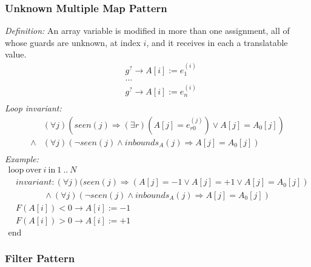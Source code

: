 \documentclass[a4paper,10pt]{article}
\newcommand{\idx}{\ensuremath{i}\xspace}
\newcommand{\at}[1]{{(#1)}}
\newcommand{\KWloop}{\ensuremath{\mathrm{loop}~}}
\newcommand{\KWend}{\ensuremath{\mathrm{end}~}}
\newcommand{\KWover}{\ensuremath{\mathrm{over}~}}
\newcommand{\KWin}{\ensuremath{~\mathrm{in}~}}
\newcommand{\impl}{\ensuremath{\Longrightarrow}}
\newcommand{\inbounds}[2]{\ensuremath{\mathit{inbounds}_{#1}(#2)}\xspace}
\newcommand{\seen}[1]{\ensuremath{\mathit{seen}(#1)}\xspace}
\newcommand{\loopinvariant}{\noindent\textit{Loop invariant:}\xspace}
\newcommand{\patterndef}{\noindent\textit{Definition:}\xspace}
\newcommand{\patternexample}{\noindent\textit{Example:}\xspace}
\begin{document}
\subsubsection*{Unknown Multiple Map Pattern}

\patterndef An array variable is modified in more than one assignment, all
of whose guards are unknown, at index \idx, and it receives in each a
translatable value.
%
\begin{eqnarray*}
&g^? \rightarrow A[\idx] := e_1^\at{\idx}\\
&...\\
&g^? \rightarrow A[\idx] := e_n^\at{\idx}\\
\end{eqnarray*}
%
\loopinvariant
%
\begin{eqnarray*}
&(\forall j)(\seen{j} \impl (\exists r)(A[j] = e_{r0}^\at{j}) \lor A[j] = A_0[j]) \\
\land&
 (\forall j)(\neg \seen{j} \land \inbounds{A}{j} \impl A[j] = A_0[j])\\
\end{eqnarray*}
%
\patternexample
$$\begin{array}{l}
  \KWloop \KWover i \KWin 1~..~N \\
  ~~~~ \textit{invariant}: (\forall j)(\seen{j} \impl (A[j] = -1 \lor A[j] = +1 \lor A[j] = A_0[j])\\
  ~~~~~~~~~~~~~~~~~~~ \land (\forall j)(\neg \seen{j} \land \inbounds{A}{j} \impl A[j] = A_0[j])\\
  ~~~~ F(A[i]) < 0 \rightarrow A[i] := -1\\
  ~~~~ F(A[i]) > 0 \rightarrow A[i] := +1\\
  \KWend
\end{array}$$

\subsubsection*{Filter Pattern}
\end{document}
